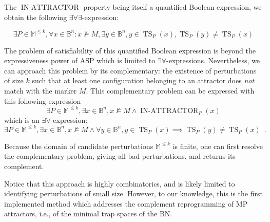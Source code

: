 \documentclass[PCJ,Unicode,screen,mode=plain]{cedram}
\begin{document}
The \(\operatorname{IN-ATTRACTOR}\) property being itself a quantified
Boolean expression, we obtain the following
\(\exists\forall\exists\)-expression:

\begin{equation}
    \exists P\in\mathbb M^{\leq k}, \forall x\in\mathbb B^n: x\not\models M, \exists y\in\mathbb B^n,
   y\in \operatorname{TS}_P(x), \operatorname{TS}_P(y) \neq \operatorname{TS}_P(x)
\end{equation}

The problem of satisfiability of this quantified Boolean expression is
beyond the expressiveness power of ASP which is limited to
\(\exists\forall\)-expressions. Nevertheless, we can approach this
problem by its complementary: the existence of perturbations of size
\(k\) such that at least one configuration belonging to an attractor
does \emph{not} match with the marker \(M\). This complementary problem
can be expressed with this following expression \begin{equation}
    \exists P\in\mathbb M^{\leq k}, \exists x\in\mathbb B^n,x\not\models M \wedge \operatorname{IN-ATTRACTOR}_P(x)
\end{equation} which is an \(\exists\forall\)-expression:
\begin{equation}
    \exists P\in\mathbb M^{\leq k}, \exists x\in\mathbb B^n, x\not\models M\wedge \forall y\in\mathbb B^n, y\in \operatorname{TS}_P(x) \implies \operatorname{TS}_P(y) \neq \operatorname{TS}_P(x)
\enspace.
\end{equation}

Because the domain of candidate perturbations \(\mathbb M^{\leq k}\) is
finite, one can first resolve the complementary problem, giving all bad
perturbations, and returns its complement.

Notice that this approach is highly combinatorics, and is likely limited
to identifying perturbations of small size. However, to our knowledge,
this is the first implemented method which addresses the complement
reprogramming of MP attractors, i.e., of the minimal trap spaces of the
BN.
\end{document}
